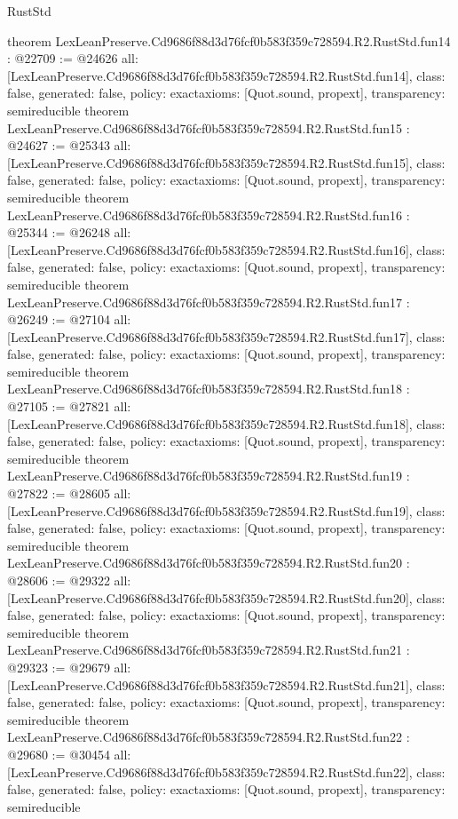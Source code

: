 \begin{lexlean}{RustStd}
\begin{coremodule}
{}
theorem LexLeanPreserve.Cd9686f88d3d76fcf0b583f359c728594.R2.RustStd.fun14 : @22709 := @24626 {
  all: [LexLeanPreserve.Cd9686f88d3d76fcf0b583f359c728594.R2.RustStd.fun14],
  class: false,
  generated: false,
  policy: exact{axioms: [Quot.sound, propext]},
  transparency: semireducible
}
theorem LexLeanPreserve.Cd9686f88d3d76fcf0b583f359c728594.R2.RustStd.fun15 : @24627 := @25343 {
  all: [LexLeanPreserve.Cd9686f88d3d76fcf0b583f359c728594.R2.RustStd.fun15],
  class: false,
  generated: false,
  policy: exact{axioms: [Quot.sound, propext]},
  transparency: semireducible
}
theorem LexLeanPreserve.Cd9686f88d3d76fcf0b583f359c728594.R2.RustStd.fun16 : @25344 := @26248 {
  all: [LexLeanPreserve.Cd9686f88d3d76fcf0b583f359c728594.R2.RustStd.fun16],
  class: false,
  generated: false,
  policy: exact{axioms: [Quot.sound, propext]},
  transparency: semireducible
}
theorem LexLeanPreserve.Cd9686f88d3d76fcf0b583f359c728594.R2.RustStd.fun17 : @26249 := @27104 {
  all: [LexLeanPreserve.Cd9686f88d3d76fcf0b583f359c728594.R2.RustStd.fun17],
  class: false,
  generated: false,
  policy: exact{axioms: [Quot.sound, propext]},
  transparency: semireducible
}
theorem LexLeanPreserve.Cd9686f88d3d76fcf0b583f359c728594.R2.RustStd.fun18 : @27105 := @27821 {
  all: [LexLeanPreserve.Cd9686f88d3d76fcf0b583f359c728594.R2.RustStd.fun18],
  class: false,
  generated: false,
  policy: exact{axioms: [Quot.sound, propext]},
  transparency: semireducible
}
theorem LexLeanPreserve.Cd9686f88d3d76fcf0b583f359c728594.R2.RustStd.fun19 : @27822 := @28605 {
  all: [LexLeanPreserve.Cd9686f88d3d76fcf0b583f359c728594.R2.RustStd.fun19],
  class: false,
  generated: false,
  policy: exact{axioms: [Quot.sound, propext]},
  transparency: semireducible
}
theorem LexLeanPreserve.Cd9686f88d3d76fcf0b583f359c728594.R2.RustStd.fun20 : @28606 := @29322 {
  all: [LexLeanPreserve.Cd9686f88d3d76fcf0b583f359c728594.R2.RustStd.fun20],
  class: false,
  generated: false,
  policy: exact{axioms: [Quot.sound, propext]},
  transparency: semireducible
}
theorem LexLeanPreserve.Cd9686f88d3d76fcf0b583f359c728594.R2.RustStd.fun21 : @29323 := @29679 {
  all: [LexLeanPreserve.Cd9686f88d3d76fcf0b583f359c728594.R2.RustStd.fun21],
  class: false,
  generated: false,
  policy: exact{axioms: [Quot.sound, propext]},
  transparency: semireducible
}
theorem LexLeanPreserve.Cd9686f88d3d76fcf0b583f359c728594.R2.RustStd.fun22 : @29680 := @30454 {
  all: [LexLeanPreserve.Cd9686f88d3d76fcf0b583f359c728594.R2.RustStd.fun22],
  class: false,
  generated: false,
  policy: exact{axioms: [Quot.sound, propext]},
  transparency: semireducible
}
\end{coremodule}
\end{lexlean}
